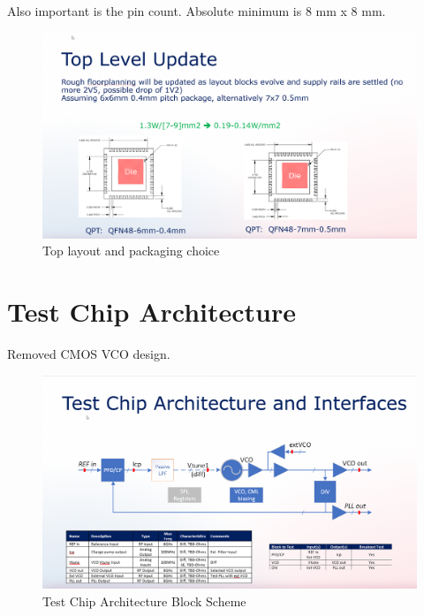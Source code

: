 \documentclass{article}
\begin{document}
Also important is the pin count. Absolute minimum is 8 mm x 8 mm.

\begin{figure}[ht!]
	\centering %
	\includegraphics[width=0.5\linewidth]{Figures/powerpoint-toplevel-packaging.png}
	\caption{Top layout and packaging choice}
	\label{fig:powerpoint-toplevel-packaging}
\end{figure}



\section{Test Chip Architecture}

Removed CMOS VCO design.

\begin{figure}[ht!]
	\centering %
	\includegraphics[width=0.5\linewidth]{Figures/test-chip-arch.png}
	\caption{Test Chip Architecture Block Scheme}
	\label{fig:test-chip-arch}
\end{figure}
\end{document}
